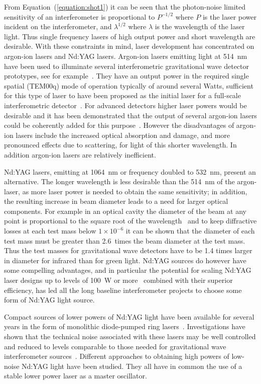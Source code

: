 \documentclass{article}
\begin{document}
From Equation~(\ref{equation:shot1}) it can be seen that the photon-noise
limited sensitivity of an interferometer is proportional to $P^{-1/2}$ where $P$
is the laser power incident on the interferometer, and $\lambda^{1/2}$ where
$\lambda$ is the wavelength of the laser light. Thus single frequency lasers of
high output power and short wavelength are desirable. With these constraints in
mind, laser development has concentrated on argon-ion lasers and Nd:YAG lasers. 
Argon-ion lasers emitting light at 514~nm have been used to illuminate several
interferometric gravitational wave detector prototypes, see for
example~\cite{Shoemaker, Robertson}. They have an output power in the required
single spatial (TEM00q) mode of operation typically of around several Watts,
sufficient for this type of laser to have been proposed as the initial laser for
a full-scale interferometric detector~\cite{Vogt}. For advanced detectors higher
laser powers would be desirable and it has been demonstrated that the output of
several argon-ion lasers could be coherently added for this purpose~\cite{Kerr}.
However the disadvantages of argon-ion lasers include the increased optical
absorption and damage, and more pronounced effects due to scattering, for light
of this shorter wavelength. In addition argon-ion lasers are relatively
inefficient.

Nd:YAG lasers, emitting at 1064~nm or frequency doubled to 532~nm, present an
alternative. The longer wavelength is less desirable than the 514~nm of the
argon-laser, as more laser power is needed to obtain the same sensitivity; in
addition, the resulting increase in beam diameter leads to a need for larger
optical components. For example in an optical cavity the diameter of the beam at
any point is proportional to the square root of the wavelength~\cite{Kogelnik}
and to keep diffractive losses at each test mass below $1 \times 10^{-6}$ it can
be shown that the diameter of each test mass must be greater than 2.6~times the
beam diameter at the test mass. Thus the test masses for gravitational wave
detectors have to be 1.4 times larger in diameter for infrared than for green
light. Nd:YAG sources do however have some compelling advantages, and in
particular the potential for scaling Nd:YAG laser designs up to levels of 100~W
or more~\cite{Shine} combined with their superior efficiency, has led all the
long baseline interferometer projects to choose some form of Nd:YAG light
source.

Compact sources of lower powers of Nd:YAG light have been available for several
years in the form of monolithic diode-pumped ring lasers~\cite{Kane1}. 
Investigations have shown that the technical noise associated with these lasers
may be well controlled and reduced to levels comparable to those needed for
gravitational wave interferometer sources~\cite{Kane2, Fritschel, Campbell,
Rowan4, Harb}. Different approaches to obtaining high powers of low-noise
Nd:YAG light have been studied. They all have in common the use of a stable
lower power laser as a master oscillator.
\end{document}
